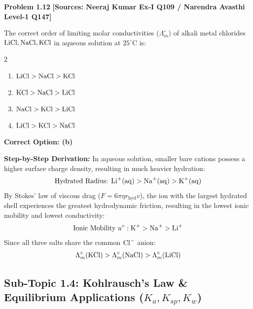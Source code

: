 \begin{problembox}
\textbf{Problem 1.12} \hfill \textbf{[Sources: Neeraj Kumar Ex-I Q109 / Narendra Avasthi Level-1 Q147]}

The correct order of limiting molar conductivities ($\Lambda_m^\circ$) of alkali metal chlorides $\ce{LiCl}, \ce{NaCl}, \ce{KCl}$ in aqueous solution at $25^\circ\text{C}$ is:
\begin{multicols}{2}
\begin{enumerate}[label=(\alph*)]
    \item $\ce{LiCl} > \ce{NaCl} > \ce{KCl}$
    \item $\ce{KCl} > \ce{NaCl} > \ce{LiCl}$
    \item $\ce{NaCl} > \ce{KCl} > \ce{LiCl}$
    \item $\ce{LiCl} > \ce{KCl} > \ce{NaCl}$
\end{enumerate}
\end{multicols}
\end{problembox}
\begin{solution}
\textbf{Correct Option: (b)}

\textbf{Step-by-Step Derivation:}
In aqueous solution, smaller bare cations possess a higher surface charge density, resulting in much heavier hydration:
\begin{equation*}
    \text{Hydrated Radius: } \ce{Li+(aq)} > \ce{Na+(aq)} > \ce{K+(aq)}
\end{equation*}
By Stokes' law of viscous drag ($F = 6\pi \eta r_{\text{hyd}} v$), the ion with the largest hydrated shell experiences the greatest hydrodynamic friction, resulting in the lowest ionic mobility and lowest conductivity:
\begin{equation*}
    \text{Ionic Mobility } u^\circ: \ce{K+} > \ce{Na+} > \ce{Li+}
\end{equation*}
Since all three salts share the common $\ce{Cl-}$ anion:
\begin{equation*}
    \Lambda_m^\circ(\ce{KCl}) > \Lambda_m^\circ(\ce{NaCl}) > \Lambda_m^\circ(\ce{LiCl})
\end{equation*}
\end{solution}

\subsection{Sub-Topic 1.4: Kohlrausch's Law \& Equilibrium Applications ($K_a, K_{sp}, K_w$)}

